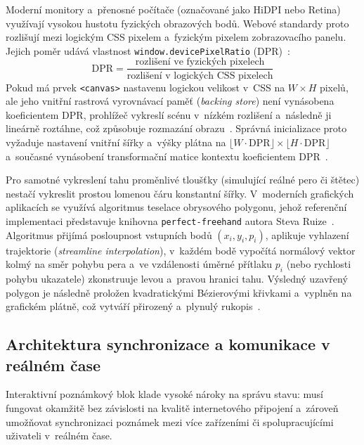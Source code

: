 \documentclass[12pt, a4paper, oneside]{article}
\begin{document}
Moderní monitory a~přenosné počítače (označované jako HiDPI nebo Retina) využívají vysokou hustotu fyzických obrazových bodů. Webové standardy proto rozlišují mezi logickým CSS pixelem a~fyzickým pixelem zobrazovacího panelu. Jejich poměr udává vlastnost \texttt{window.devicePixelRatio} (DPR)~\cite{mdn_dpr}:
\begin{equation}
    \text{DPR} = \frac{\text{rozlišení ve fyzických pixelech}}{\text{rozlišení v~logických CSS pixelech}}
    \label{eq:dpr}
\end{equation}
Pokud má prvek \texttt{<canvas>} nastavenu logickou velikost v~CSS na $W \times H$ pixelů, ale jeho vnitřní rastrová vyrovnávací paměť (\textit{backing store}) není vynásobena koeficientem DPR, prohlížeč vykreslí scénu v~nízkém rozlišení a~následně ji lineárně roztáhne, což způsobuje rozmazání obrazu~\cite{mdn_dpr}. Správná inicializace proto vyžaduje nastavení vnitřní šířky a~výšky plátna na $\lfloor W \cdot \text{DPR} \rfloor \times \lfloor H \cdot \text{DPR} \rfloor$ a~současné vynásobení transformační matice kontextu koeficientem DPR~\cite{mdn_canvas, mdn_dpr}.

Pro samotné vykreslení tahu proměnlivé tloušťky (simulující reálné pero či štětec) nestačí vykreslit prostou lomenou čáru konstantní šířky. V~moderních grafických aplikacích se využívá algoritmus teselace obrysového polygonu, jehož referenční implementaci představuje knihovna \texttt{perfect-freehand} autora Steva Ruize~\cite{ruiz_freehand}. Algoritmus přijímá posloupnost vstupních bodů $(x_i, y_i, p_i)$, aplikuje vyhlazení trajektorie (\textit{streamline interpolation}), v~každém bodě vypočítá normálový vektor kolmý na směr pohybu pera a~ve vzdálenosti úměrné přítlaku $p_i$ (nebo rychlosti pohybu ukazatele) zkonstruuje levou a~pravou hranici tahu. Výsledný uzavřený polygon je následně proložen kvadratickými Bézierovými křivkami a~vyplněn na grafickém plátně, což vytváří přirozený a~plynulý rukopis~\cite{ruiz_freehand}.


\subsection{Architektura synchronizace a komunikace v reálném čase}
\label{sec:teorie_sync}

Interaktivní poznámkový blok klade vysoké nároky na správu stavu: musí fungovat okamžitě bez závislosti na kvalitě internetového připojení a~zároveň umožňovat synchronizaci poznámek mezi více zařízeními či spolupracujícími uživateli v~reálném čase.
\end{document}

